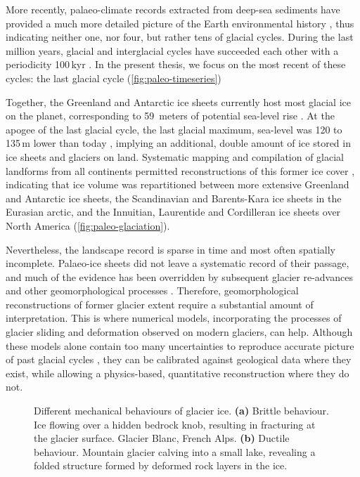 \documentclass{article}
\newcommand{\subgraphics}[3][,]{%
  \setbox1=\hbox{\texttt{[image: \#3]}}%
  \leavevmode\rlap{\usebox1}%
  \rlap{\hspace*{0.25em}
        \raisebox{\dimexpr\ht1-3ex}{\textbf{(#2)}}}%
  \phantom{\usebox1}%
}
\begin{document}
More recently, palaeo-climate records extracted from deep-sea sediments have
provided a much more detailed picture of the Earth environmental history
\citep[e.g.,][]{Emiliani.1955, Shackleton.Opdyke.1973}, thus indicating neither
one, nor four, but rather tens of glacial cycles. During the last million
years, glacial and interglacial cycles have succeeded each other with a
periodicity 100\,kyr \citep{Hays.etal.1976}. In the present thesis, we focus on
the most recent of these cycles: the last glacial cycle
(\cref{fig:paleo-timeseries})

Together, the Greenland and Antarctic ice sheets currently host most glacial
ice on the planet, corresponding to 59~meters of potential sea-level rise
\citep{Bamber.etal.2001, Fretwell.etal.2013}. At the apogee of the last glacial
cycle, the last glacial maximum, sea-level was 120 to 135\,m lower than today
\citep{Clark.Mix.2002}, implying an additional, double amount of ice stored in
ice sheets and glaciers on land. Systematic mapping and compilation of glacial
landforms from all continents permitted reconstructions of this former ice
cover \citep{Ehlers.Gibbard.2007}, indicating that ice volume
was repartitioned between more extensive Greenland and Antarctic ice sheets,
the Scandinavian and Barents-Kara ice sheets in the Eurasian arctic, and the
Innuitian, Laurentide and Cordilleran ice sheets over North America
(\cref{fig:paleo-glaciation}).

Nevertheless, the landscape record is sparse in time and most often spatially
incomplete. Palaeo-ice sheets did not leave a systematic record of their
passage, and much of the evidence has been overridden by subsequent glacier
re-advances and other geomorphological processes \citep{Kleman.1994}.
Therefore, geomorphological reconstructions of former glacier extent require a
substantial amount of interpretation. This is where numerical models,
incorporating the processes of glacier sliding \citep[e.g.,][]{Weertman.1957}
and deformation \citep[e.g.,][]{Nye.1953} observed on modern glaciers, can help.
Although these models alone contain too many uncertainties to reproduce
accurate picture of past glacial cycles \citep[e.g.,][]{Hebeler.etal.2008},
they can be calibrated against geological data where they exist, while
allowing a physics-based, quantitative reconstruction where they do not.

\begin{figure}
  \centering
  \makebox[0pt]{
    \subgraphics{a}{photo-glacier-crevasses}
    \hspace{1cm}
    \subgraphics{b}{photo-glacier-fold}
  }
  \caption{Different mechanical behaviours of glacier ice.
           \textbf{(a)} Brittle behaviour. Ice flowing over a hidden bedrock
           knob, resulting in fracturing at the glacier surface.
           Glacier Blanc, French Alps.
           \textbf{(b)} Ductile behaviour. Mountain glacier calving into a
           small lake, revealing a folded structure formed by deformed rock
           layers in the ice.}
  \label{fig:glacier-mechanics}
\end{figure}
\end{document}
